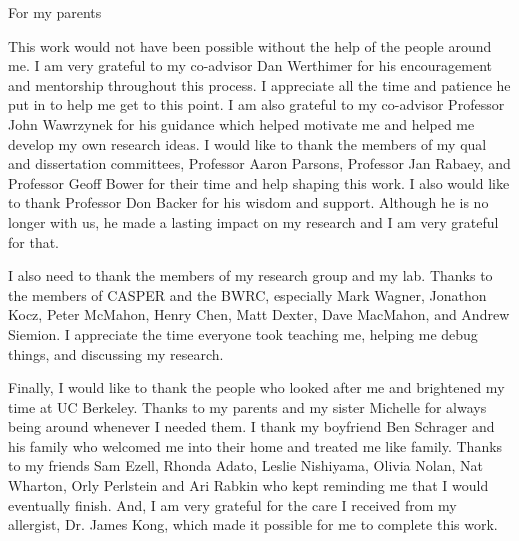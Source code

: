 \documentclass{ucbthesis}
\begin{document}
\begin{frontmatter}

\begin{dedication}
\null\vfil
\begin{center}
For my parents\\\vspace{12pt}
\end{center}
\vfil\null
\end{dedication}

\tableofcontents
\clearpage
\listoffigures
\clearpage
\listoftables

\begin{acknowledgements}
This work would not have been possible without the help of the people around me.
I am very grateful to my co-advisor Dan Werthimer for his encouragement and mentorship throughout this process.
I appreciate all the time and patience he put in to help me get to this point.
I am also grateful to my co-advisor Professor John Wawrzynek for his guidance which helped motivate me and helped me develop my own research ideas. 
I would like to thank the members of my qual and dissertation committees, Professor Aaron Parsons, Professor Jan Rabaey, and Professor Geoff Bower for their time and help shaping this work.
I also would like to thank Professor Don Backer for his wisdom and support.
Although he is no longer with us, he made a lasting impact on my research and I am very grateful for that.

I also need to thank the members of my research group and my lab.
Thanks to the members of CASPER and the BWRC, especially Mark Wagner, Jonathon Kocz, Peter McMahon, Henry Chen, Matt Dexter, Dave MacMahon, and Andrew Siemion.
I appreciate the time everyone took teaching me, helping me debug things, and discussing my research. 

Finally, I would like to thank the people who looked after me and brightened my time at UC Berkeley.
Thanks to my parents and my sister Michelle for always being around whenever I needed them.
I thank my boyfriend Ben Schrager and his family who welcomed me into their home and treated me like family.
Thanks to my friends Sam Ezell, Rhonda Adato, Leslie Nishiyama, Olivia Nolan, Nat Wharton, Orly Perlstein and Ari Rabkin who kept reminding me that I would eventually finish.
And, I am very grateful for the care I received from my allergist, Dr. James Kong, which made it possible for me to complete this work.

\end{acknowledgements}

\end{frontmatter}

\pagestyle{headings}


 
 
 
 
 
 
 



\printbibliography
\end{document}
